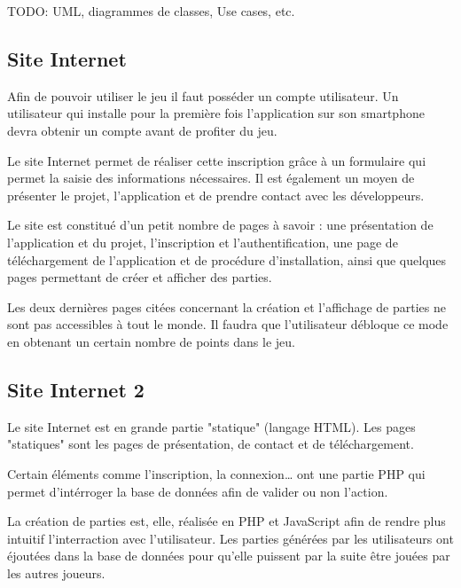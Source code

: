 \documentclass[a4paper,11pt,french]{article}
\begin{document}

TODO: UML, diagrammes de classes, Use cases, etc.

\subsection{Site Internet}
Afin de pouvoir utiliser le jeu il faut posséder un compte utilisateur. Un utilisateur qui installe pour la première fois l'application sur son smartphone devra obtenir un compte avant de profiter du jeu.

Le site Internet permet de réaliser cette inscription grâce à un formulaire qui permet la saisie des informations nécessaires. Il est également un moyen de présenter le projet, l'application et de prendre contact avec les développeurs.

Le site est constitué d'un petit nombre de pages à savoir : une présentation de l'application et du projet, l'inscription et l'authentification, une page de téléchargement de l'application et de procédure d'installation, ainsi que quelques pages permettant de créer et afficher des parties.

Les deux dernières pages citées concernant la création et l'affichage de parties ne sont pas accessibles à tout le monde. Il faudra que l'utilisateur débloque ce mode en obtenant un certain nombre de points dans le jeu.

\subsection{Site Internet 2}
Le site Internet est en grande partie "statique" (langage HTML). Les pages "statiques" sont les pages de présentation, de contact et de téléchargement.

Certain éléments comme l'inscription, la connexion\dots{} ont une partie PHP qui permet d'intérroger la base de données afin de valider ou non l'action.

La création de parties est, elle, réalisée en PHP et JavaScript afin de rendre plus intuitif l'interraction avec l'utilisateur. Les parties générées par les utilisateurs ont éjoutées dans la base de données pour qu'elle puissent par la suite être jouées par les autres joueurs.
\end{document}
